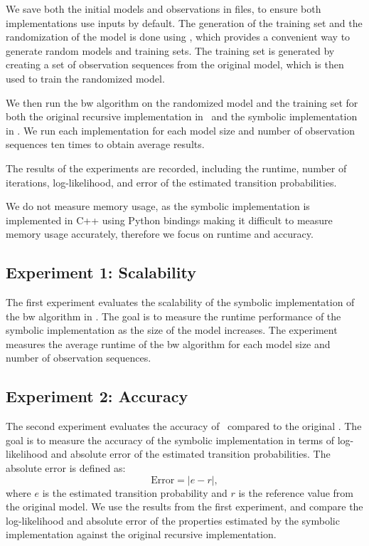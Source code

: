 We save both the initial models and observations in files, to ensure both implementations use inputs by default.
The generation of the training set and the randomization of the model is done using \Jajapy, which provides a convenient way to generate random models and training sets.
The training set is generated by creating a set of observation sequences from the original model, which is then used to train the randomized model.

We then run the \gls{bw} algorithm on the randomized model and the training set for both the original recursive implementation in \Jajapy\ and the symbolic implementation in \JajapyTwo.
We run each implementation for each model size and number of observation sequences ten times to obtain average results.

The results of the experiments are recorded, including the runtime, number of iterations, log-likelihood, and error of the estimated transition probabilities.

We do not measure memory usage, as the symbolic implementation is implemented in C++ using Python bindings making it difficult to measure memory usage accurately, therefore we focus on runtime and accuracy.

\subsection{Experiment 1: Scalability}\label{sec:exp_scalability}
The first experiment evaluates the scalability of the symbolic implementation of the \gls{bw} algorithm in \JajapyTwo.
The goal is to measure the runtime performance of the symbolic implementation as the size of the model increases.
The experiment measures the average runtime of the \gls{bw} algorithm for each model size and number of observation sequences.

\subsection{Experiment 2: Accuracy}\label{sec:exp_accuracy}
The second experiment evaluates the accuracy of \JajapyTwo\ compared to the original \Jajapy.
The goal is to measure the accuracy of the symbolic implementation in terms of log-likelihood and absolute error of the estimated transition probabilities.
The absolute error is defined as:
\[
    \text{Error} = |e - r|,
\]
where $e$ is the estimated transition probability and $r$ is the reference value from the original model.
We use the results from the first experiment, and compare the log-likelihood and absolute error of the properties estimated by the symbolic implementation against the original recursive implementation.

